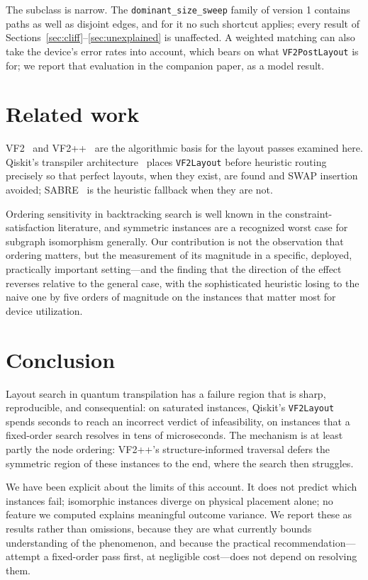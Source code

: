 \documentclass[11pt]{article}
\begin{document}
The subclass is narrow. The \texttt{dominant\_size\_sweep} family of
version 1 contains paths as well as disjoint edges, and for it no such
shortcut applies; every result of Sections~\ref{sec:cliff}--\ref{sec:unexplained}
is unaffected. A weighted matching can also take the device's error
rates into account, which bears on what \texttt{VF2PostLayout} is for; we
report that evaluation in the companion paper, as a model result.

\section{Related work}

VF2~\cite{vf2} and VF2++~\cite{vf2pp} are the algorithmic basis for the
layout passes examined here. Qiskit's transpiler
architecture~\cite{qiskit} places \texttt{VF2Layout} before heuristic
routing precisely so that perfect layouts, when they exist, are found
and SWAP insertion avoided; SABRE~\cite{sabre} is the heuristic
fallback when they are not.

Ordering sensitivity in backtracking search is well known in the
constraint-satisfaction literature, and symmetric instances are a
recognized worst case for subgraph isomorphism generally. Our
contribution is not the observation that ordering matters, but the
measurement of its magnitude in a specific, deployed, practically
important setting---and the finding that the direction of the effect
reverses relative to the general case, with the sophisticated heuristic
losing to the naive one by five orders of magnitude on the instances
that matter most for device utilization.

\section{Conclusion}

Layout search in quantum transpilation has a failure region that is
sharp, reproducible, and consequential: on saturated instances, Qiskit's
\texttt{VF2Layout} spends seconds to reach an incorrect verdict of
infeasibility, on instances that a fixed-order search resolves in tens
of microseconds. The mechanism is at least partly the node ordering:
VF2++'s structure-informed traversal defers the symmetric region of
these instances to the end, where the search then struggles.

We have been explicit about the limits of this account. It does not
predict which instances fail; isomorphic instances diverge on physical
placement alone; no feature we computed explains meaningful outcome
variance. We report these as results rather than omissions, because
they are what currently bounds understanding of the phenomenon, and
because the practical recommendation---attempt a fixed-order pass first,
at negligible cost---does not depend on resolving them.
\end{document}

